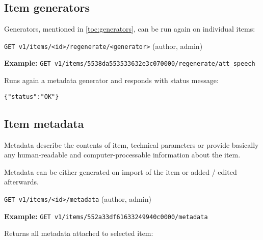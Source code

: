 \documentclass{book}
\newcommand{\request}[2]{{\color{blue}\texttt{#1} (#2)}}
\newcommand{\reqexample}[1]{{\color{blue}\textbf{Example:} \texttt{#1}}}
\begin{document}
\subsection{Item generators}
Generators, mentioned in \ref{toc:generators}, can be run again on individual items:

\request{GET v1/items/<id>/regenerate/<generator>}{author, admin}

\reqexample{GET v1/items/5538da553533632e3c070000/regenerate/att\_speech}

Runs again a metadata generator and responds with status message:

\begin{verbatim}
{"status":"OK"}
\end{verbatim}

\subsection{Item metadata}
Metadata describe the contents of item, technical parameters or provide basically any human-readable and computer-processable information about the item.

Metadata can be either generated on import of the item or added / edited afterwards.

\request{GET v1/items/<id>/metadata}{author, admin}

\reqexample{GET v1/items/552a33df61633249940c0000/metadata}

Returns all metadata attached to selected item:
\end{document}
